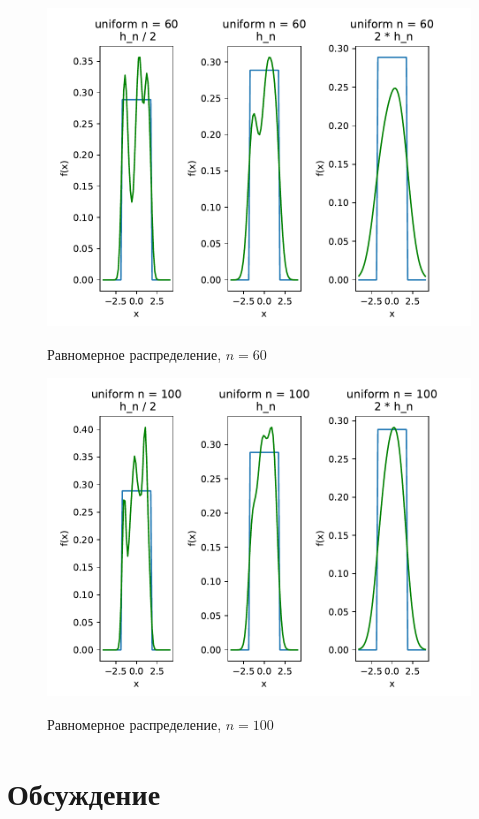 \documentclass[a4paper]{article}
\begin{document}
\begin{figure}[H]
	\centering
	{\includegraphics[scale=0.5]{src_lab_4/kde_60_uniform}}
		\caption{Равномерное распределение, $n=60$}
		\label{fig:kde_uniform_60}
	\end{figure}

\begin{figure}[H]
	\centering
	{\includegraphics[scale=0.5]{src_lab_4/kde_100_uniform}}
		\caption{Равномерное распределение, $n=100$}
		\label{fig:kde_uniform_100}
	\end{figure}
\section{Обсуждение}
\end{document}
